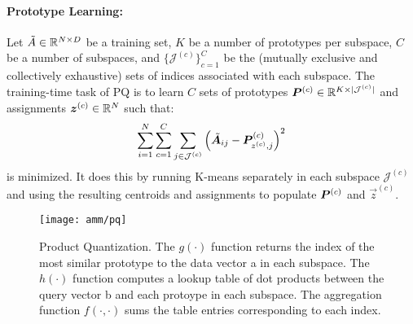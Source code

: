 \paragraph{Prototype Learning:}

Let $\tilde{A} \in \mathbb{R}^{N \times D}$ be a training set, $K$ be a number of prototypes per subspace, $C$ be a number of subspaces, and $\{\mathcal{J}^{(c)}\}_{c=1}^C$ be the (mutually exclusive and collectively exhaustive) sets of indices associated with each subspace. The training-time task of PQ is to learn $C$ sets of prototypes $\bm{P}^{(c)} \in \mathbb{R}^{K \times |\mathcal{J}^{(c)}|}$ and assignments $\bm{z}^{(c)} \in \mathbb{R}^{N}$ such that:
\vspace{-2mm}
\begin{align}
    \sum_{i=1}^N \sum_{c=1}^C \sum_{j\in \mathcal{J}^{(c)}} \left( \tilde{\A}_{ij} - \mat{P}^{(c)}_{z^{(c)},j} \right)^2
\vspace*{-.5mm}
\end{align}
is minimized. It does this by running K-means separately in each subspace $\mathcal{J}^{(c)}$ and using the resulting centroids and assignments to populate $\bm{P}^{(c)}$ and $\vec{z}^{(c)}$.

\begin{figure}[t]
\begin{center}
\texttt{[image: amm/pq]}
\caption{Product Quantization. The $g(\cdot)$ function returns the index of the most similar prototype to the data vector a in each subspace. The $h(\cdot)$ function computes a lookup table of dot products between the query vector b and each protoype in each subspace. The aggregation function $f(\cdot,\cdot)$ sums the table entries corresponding to each index.}
\label{fig:pq}
\end{center}
\end{figure}




